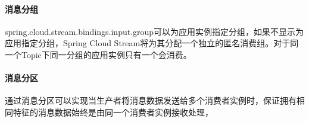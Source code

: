\documentclass[letterpaper,10pt,english]{sphinxmanual}
\begin{document}
\paragraph{消息分组}
\label{\detokenize{01.spring-cloud/07.stream/stream_01:id6}}
spring.cloud.stream.bindings.input.group可以为应用实例指定分组，如果不显示为应用指定分组，Spring Cloud Stream将为其分配一个独立的匿名消费组。对于同一个Topic下同一分组的应用实例只有一个会消费。


\paragraph{消息分区}
\label{\detokenize{01.spring-cloud/07.stream/stream_01:id7}}
通过消息分区可以实现当生产者将消息数据发送给多个消费者实例时，保证拥有相同特征的消息数据始终是由同一个消费者实例接收处理，



\renewcommand{\indexname}{Index}
\printindex
\end{document}
